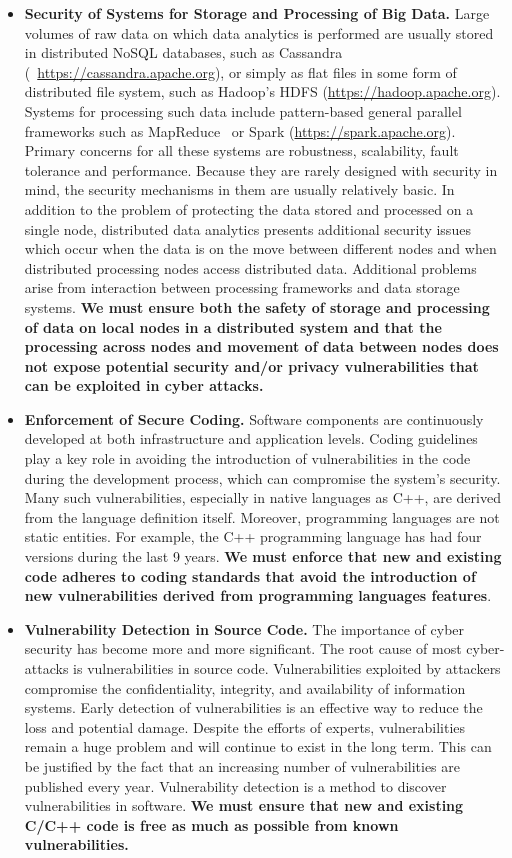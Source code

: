 \documentclass[a4paper,11pt]{article}
\begin{document}
\begin{itemize}
\item \textbf{Security of Systems for Storage and Processing of Big Data.} Large volumes of raw data on which data analytics is performed are usually stored in distributed NoSQL databases, such as Cassandra (~\url{https://cassandra.apache.org}), or simply as flat files in some form of distributed file system, such as Hadoop's HDFS (\url{https://hadoop.apache.org}). Systems for processing such data include pattern-based general parallel frameworks such as MapReduce~\cite{mapreduce} or Spark (\url{https://spark.apache.org}). Primary concerns for all these systems are robustness, scalability, fault tolerance and performance. Because they are rarely designed with security in mind, the security mechanisms in them are usually relatively basic. In addition to the problem of protecting the data stored and processed on a single node, distributed data analytics presents additional security issues which occur when the data is on the move between different nodes and when distributed processing nodes access distributed data. Additional problems arise from interaction between processing frameworks and data storage systems. \textbf{We must ensure both the safety of storage and processing of data on local nodes in a distributed system and that the processing across nodes and movement of data between nodes does not expose potential security and/or privacy vulnerabilities that can be exploited in cyber attacks.}

\item \textbf{Enforcement of Secure Coding.} Software components are continuously developed at both infrastructure and application levels. Coding guidelines play a key role in avoiding the introduction of vulnerabilities in the code during the development process, which can compromise the system's security. Many such vulnerabilities, especially in native languages as C++, are derived from the language definition itself. Moreover, programming languages are not static entities. For example, the C++ programming language has had four versions during the last 9 years. \textbf{We must enforce that new and existing code adheres to coding standards that avoid the introduction of new vulnerabilities derived from programming languages features}. 

\item \textbf{Vulnerability Detection in Source Code.} The importance of cyber security has become more and more signiﬁcant. The root cause of most cyber-attacks is vulnerabilities in source code. Vulnerabilities exploited by attackers compromise the conﬁdentiality, integrity, and availability of information systems. Early detection of vulnerabilities is an eﬀective way to reduce the loss and potential damage. Despite the efforts of experts, vulnerabilities remain a huge problem and will continue to exist in the long term. This can be justiﬁed by the fact that an increasing number of vulnerabilities are published every year. Vulnerability detection is a method to discover vulnerabilities in software. \textbf{We must ensure that new and existing C/C++ code is free as much as possible from known vulnerabilities.}


\end{itemize}
\end{document}
